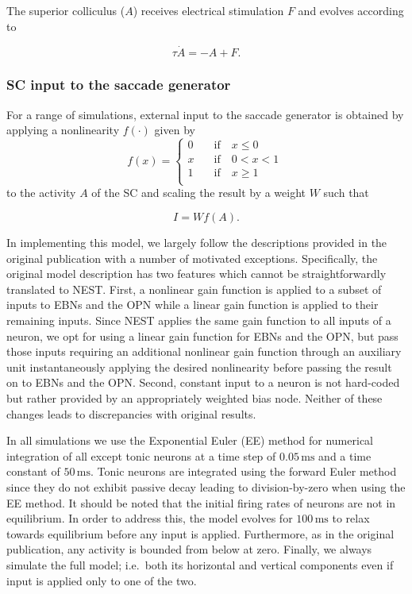 \documentclass[10pt,a4paper,onecolumn]{article}
\begin{document}
The superior colliculus (\(A\)) receives electrical stimulation \(F\)
and evolves according to

\begin{equation}
\tau \dot A =-A+F \textrm{.}
\label{eq:sc}\end{equation}

\subsubsection{SC input to the saccade
generator}\label{sc-input-to-the-saccade-generator}

For a range of simulations, external input to the saccade generator is
obtained by applying a nonlinearity \(f(\cdot)\) given by
\begin{equation}
f(x) = 
\left\{
 \begin{array}{lll}
    0 \quad &\textrm{if} \quad x \leq 0 \\
    x \quad &\textrm{if} \quad 0<x<1 \\
    1 \quad &\textrm{if} \quad x \geq 1 \\
  \end{array}
\right.\
\label{eq:pw}\end{equation} to the activity \(A\) of the SC and scaling
the result by a weight \(W\) such that

\begin{equation}
I = Wf(A) \textrm{.}
\label{eq:stim}\end{equation}

In implementing this model, we largely follow the descriptions provided
in the original publication with a number of motivated exceptions.
Specifically, the original model description has two features which
cannot be straightforwardly translated to NEST. First, a nonlinear gain
function is applied to a subset of inputs to EBNs and the OPN while a
linear gain function is applied to their remaining inputs. Since NEST
applies the same gain function to all inputs of a neuron, we opt for
using a linear gain function for EBNs and the OPN, but pass those inputs
requiring an additional nonlinear gain function through an auxiliary
unit instantaneously applying the desired nonlinearity before passing
the result on to EBNs and the OPN. Second, constant input to a neuron is
not hard-coded but rather provided by an appropriately weighted bias
node. Neither of these changes leads to discrepancies with original
results.

In all simulations we use the Exponential Euler (EE) method for
numerical integration of all except tonic neurons \autocite{Hahne2017}
at a time step of \(0.05\,\mathrm{ms}\) and a time constant of
\(50\,\mathrm{ms}\). Tonic neurons are integrated using the forward
Euler method since they do not exhibit passive decay leading to
division-by-zero when using the EE method. It should be noted that the
initial firing rates of neurons are not in equilibrium. In order to
address this, the model evolves for \(100\,\mathrm{ms}\) to relax
towards equilibrium before any input is applied. Furthermore, as in the
original publication, any activity is bounded from below at zero.
Finally, we always simulate the full model; i.e.~both its horizontal and
vertical components even if input is applied only to one of the two.
\end{document}
